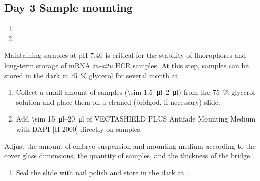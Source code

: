 \documentclass[10pt]{report}
\begin{document}
\subsection*{Day 3 \textendash{} Sample mounting}

\begin{enumerate}[series = steps]
	\item {}
	\item {}
\end{enumerate}

\bigskip\alert{Maintaining samples at pH 7.40 is critical for the stability of fluorophores and long-term storage of mRNA \textit{in-situ} HCR samples.}
\alert{At this step, samples can be stored in the dark in \qty{75}{\percent} glycerol for several month at \fourdegree.}

\begin{enumerate}[resume = steps]
	\item Collect a small amount of samples (\qtyrange{\sim 1.5}{2}{\ul}) from the \qty{75}{\percent} glycerol solution and place them on a cleaned (bridged, if necessary) slide.
	\item Add \qtyrange{\sim 15}{20}{\ul} of VECTASHIELD\textregistered{} PLUS Antifade Mounting Medium with DAPI [H-2000] directly on samples.
\end{enumerate}

\bigskip\alert{Adjust the amount of embryo suspension and mounting medium according to the cover glass dimensions, the quantity of samples, and the thickness of the bridge.}

\begin{enumerate}[resume = steps]
	\item	Seal the slide with nail polish and store in the dark at \fourdegree.
\end{enumerate}
\end{document}
